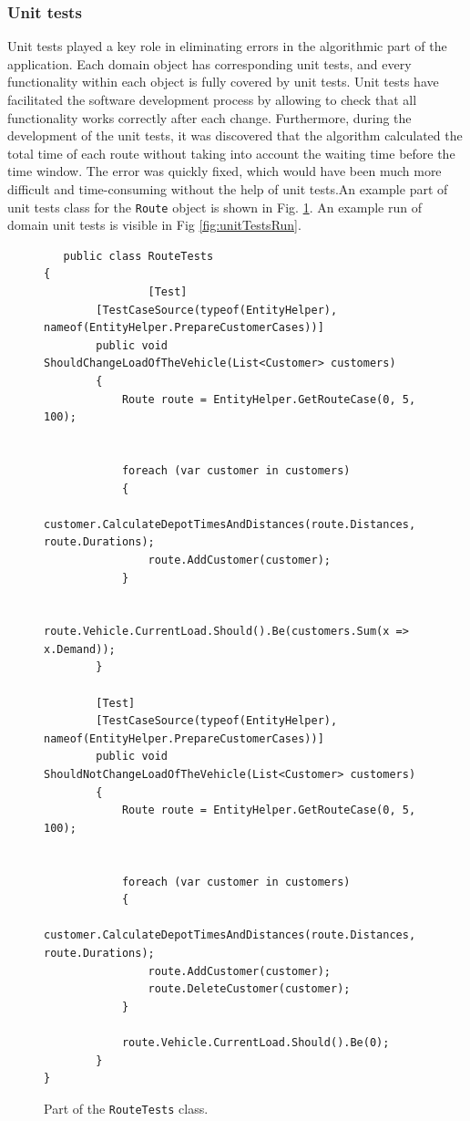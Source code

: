 \documentclass[a4paper,twoside,12pt]{book}
\begin{document}
\subsubsection{Unit tests}
Unit tests played a key role in eliminating errors in the algorithmic part of the application. Each domain object has corresponding unit tests, and every functionality within each object is fully covered by unit tests. Unit tests have facilitated the software development process by allowing to check that all functionality works correctly after each change. Furthermore, during the development of the unit tests, it was discovered that the algorithm calculated the total time of each route without taking into account the waiting time before the time window. The error was quickly fixed, which would have been much more difficult and time-consuming without the help of unit tests.An example part of unit tests class for the \lstinline|Route| object is shown in Fig. \ref{fig:routeUnitTests}. An example run of domain unit tests is visible in Fig \ref{fig:unitTestsRun}.

\begin{figure}[htbp]
\centering
\begin{lstlisting}
   public class RouteTests
{
                [Test]
        [TestCaseSource(typeof(EntityHelper), nameof(EntityHelper.PrepareCustomerCases))]
        public void ShouldChangeLoadOfTheVehicle(List<Customer> customers)
        {
            Route route = EntityHelper.GetRouteCase(0, 5, 100);


            foreach (var customer in customers)
            {
                customer.CalculateDepotTimesAndDistances(route.Distances, route.Durations);
                route.AddCustomer(customer);
            }

            route.Vehicle.CurrentLoad.Should().Be(customers.Sum(x => x.Demand));
        }

        [Test]
        [TestCaseSource(typeof(EntityHelper), nameof(EntityHelper.PrepareCustomerCases))]
        public void ShouldNotChangeLoadOfTheVehicle(List<Customer> customers)
        {
            Route route = EntityHelper.GetRouteCase(0, 5, 100);


            foreach (var customer in customers)
            {
                customer.CalculateDepotTimesAndDistances(route.Distances, route.Durations);
                route.AddCustomer(customer);
                route.DeleteCustomer(customer);
            }

            route.Vehicle.CurrentLoad.Should().Be(0);
        }
}

\end{lstlisting}
\caption{Part of the \lstinline|RouteTests| class.}
\label{fig:routeUnitTests}
\end{figure}
\end{document}
